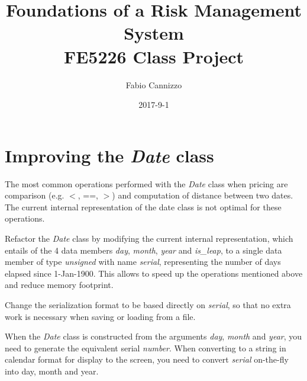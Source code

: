 \documentclass[10pt]{article}
\title{Foundations of a Risk Management System \\
\large FE5226 Class Project
}
\author{Fabio Cannizzo}
\date{2017-9-1}
\begin{document}
\maketitle


\section{Improving the \textit{Date} class}
The most common operations performed with the \textit{Date} class when pricing are comparison (e.g. $<$, ==, $>$) and computation of distance between two dates. The current internal representation of the date class is not optimal for these operations.

Refactor the \textit{Date} class by modifying the current internal representation, which entails of the 4 data members \textit{day}, \textit{month}, \textit{year} and \textit{is\_leap}, to a single data member of type \textit{unsigned} with name \textit{serial}, representing the number of days elapsed since 1-Jan-1900. This allows to speed up the operations mentioned above and reduce memory footprint.

Change the serialization format to be based directly on \textit{serial}, so that no extra work is necessary when saving or loading from a file.

When the \textit{Date} class is constructed from the arguments \textit{day}, \textit{month} and \textit{year}, you need to generate the equivalent serial \textit{number}. When converting to a string in calendar format for display to the screen, you need to convert \textit{serial} on-the-fly into day, month and year.
\end{document}
